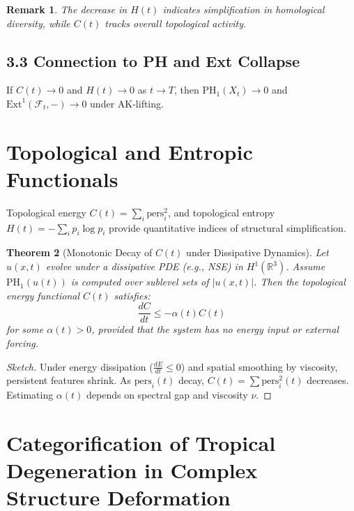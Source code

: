 \documentclass[11pt]{article}
\newtheorem{theorem}{Theorem}[section]
\newtheorem{remark}[theorem]{Remark}
\begin{document}
\begin{remark}
The decrease in $H(t)$ indicates simplification in homological diversity, while $C(t)$ tracks overall topological activity.
\end{remark}

\subsection{3.3 Connection to PH and Ext Collapse}

\begin{proposition}
If $C(t) \to 0$ and $H(t) \to 0$ as $t \to T$, then $\mathrm{PH}_1(X_t) \to 0$ and $\mathrm{Ext}^1(\mathcal{F}_t, -) \to 0$ under AK-lifting.
\end{proposition}
\section{Topological and Entropic Functionals}
Topological energy \( C(t) = \sum_i \text{pers}_i^2 \), and topological entropy \( H(t) = -\sum_i p_i \log p_i \) provide quantitative indices of structural simplification.

\begin{theorem}[Monotonic Decay of $C(t)$ under Dissipative Dynamics]
Let $u(x,t)$ evolve under a dissipative PDE (e.g., NSE) in $H^1(\mathbb{R}^3)$. Assume $\mathrm{PH}_1(u(t))$ is computed over sublevel sets of $|u(x,t)|$. Then the topological energy functional $C(t)$ satisfies:
\[
\frac{dC}{dt} \leq -\alpha(t) C(t)
\]
for some $\alpha(t) > 0$, provided that the system has no energy input or external forcing.
\end{theorem}

\begin{proof}[Sketch]
Under energy dissipation ($\frac{dE}{dt} \leq 0$) and spatial smoothing by viscosity, persistent features shrink. As $\text{pers}_i(t)$ decay, $C(t) = \sum \text{pers}_i^2(t)$ decreases. Estimating $\alpha(t)$ depends on spectral gap and viscosity $\nu$.
\end{proof}




\section{Categorification of Tropical Degeneration in Complex Structure Deformation}
\end{document}
